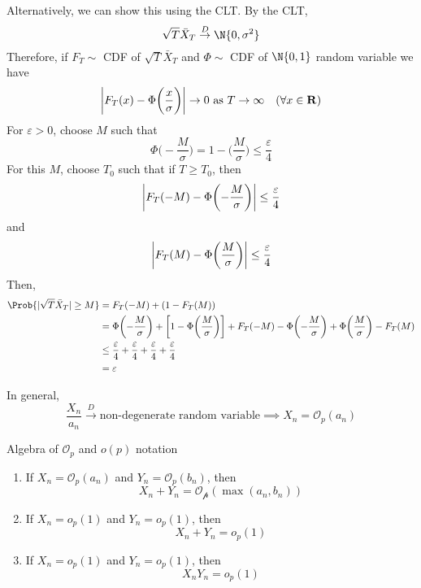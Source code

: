 \begin{Remark}{}{}
    Alternatively, we can show this using the CLT\@. By the CLT,
    \[ \sqrt{T}\bar{X}_T\stackrel{D}{\to}\N{0,\sigma^2} \]
    Therefore, if $ F_T\sim $ CDF of $ \sqrt{T}\bar{X}_T $ and $ \Phi\sim $
    CDF of $ \N{0,1} $ random variable we have
    \[ \abs*{F_T(x)-\Phi\biggl(\frac{x}{\sigma}\biggr)}\to 0\text{ as }T\to\infty\quad (\forall x\in\mathbf{R}) \]
    For $ \varepsilon>0 $, choose $ M $ such that
    \[ \Phi\biggl(-\frac{M}{\sigma}\biggr)=1-\biggl(\frac{M}{\sigma}\biggr)\le \frac{\varepsilon}{4} \]
    For this $ M $, choose $ T_0 $ such that if $ T\ge T_0 $, then
    \[ \abs*{F_T(-M)-\Phi\biggl(-\frac{M}{\sigma}\biggr)}\le \frac{\varepsilon}{4} \]
    and
    \[ \abs*{F_T(M)-\Phi\biggl(\frac{M}{\sigma}\biggr)}\le \frac{\varepsilon}{4} \]
    Then,
    \begin{align*}
        \Prob{\abs{\sqrt{T}\bar{X}_T}\ge M}
         & =F_T(-M)+(1-F_T(M))                                                                                                                                                            \\
         & =\Phi\biggl(-\frac{M}{\sigma}\biggr)+\biggl[1-\Phi\biggl(\frac{M}{\sigma} \biggr)\biggr]+F_T(-M)-\Phi\biggl(-\frac{M}{\sigma}\biggr)+\Phi\biggl(\frac{M}{\sigma}\biggr)-F_T(M) \\
         & \le \frac{\varepsilon}{4}+\frac{\varepsilon}{4} + \frac{\varepsilon}{4} + \frac{\varepsilon}{4}                                                                                \\
         & = \varepsilon
    \end{align*}
\end{Remark}
\begin{Remark}{}{}
    In general,
    \[ \frac{X_n}{a_n}\stackrel{D}{\to}\text{non-degenerate random variable}\implies X_n=\mathcal{O}_p(a_n)  \]
\end{Remark}
\begin{Remark}{Algebra of $ \mathcal{O}_p $ and $ o(p) $ notation}{}
    \begin{enumerate}
        \item If $ X_n=\mathcal{O}_p(a_n) $ and $ Y_n=\mathcal{O}_p(b_n) $, then
              \[ X_n+Y_n=\mathcal{O_p}(\max(a_n,b_n)) \]
        \item If $ X_n=o_p(1) $ and $ Y_n=o_p(1) $, then
              \[ X_n+Y_n=o_p(1) \]
        \item If $ X_n=o_p(1) $ and $ Y_n=o_p(1) $, then
              \[ X_n Y_n=o_p(1) \]
    \end{enumerate}
\end{Remark}
